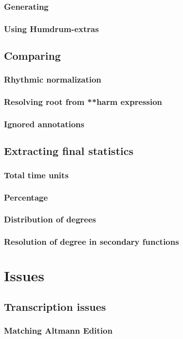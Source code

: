     \subsubsection{Generating}
		\subsubsection{Using Humdrum-extras}
	\subsection{Comparing}
		\subsubsection{Rhythmic normalization}
		\subsubsection{Resolving root from **harm expression}
		\subsubsection{Ignored annotations}
	\subsection{Extracting final statistics}
		\subsubsection{Total time units}
		\subsubsection{Percentage}
		\subsubsection{Distribution of degrees}
		\subsubsection{Resolution of degree in secondary functions}
\section{Issues}
	\subsection{Transcription issues}
		\subsubsection{Matching Altmann Edition}
